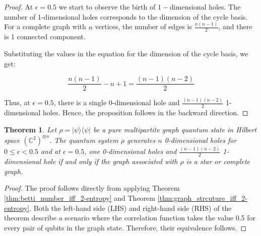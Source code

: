 \documentclass{article}
\newtheorem{theorem}{Theorem}
\newtheorem{corollary}[theorem]{Corollary}
\newcommand{\ket}[1]{|#1\rangle}
\newcommand{\bra}[1]{\langle #1|}
\begin{document}
\begin{proof}
At $\epsilon = 0.5$ we start to observe the birth of $1-$dimensional holes. The number of 1-dimensional holes corresponds to the dimension of the cycle basis. For a complete graph with $ n $ vertices, the number of edges is $ \frac{n(n-1)}{2} $, and there is 1 connected component. 


Substituting the values in the equation for the dimension of the cycle basis, we get:

\begin{equation}
\frac{n(n-1)}{2} - n + 1 = \frac{(n-1)(n-2)}{2}
\end{equation}


Thus, at $ \epsilon = 0.5 $, there is a single 0-dimensional hole and $ \frac{(n-1)(n-2)}{2} $ 1-dimensional holes. Hence, the proposition follows in the backward direction.
\end{proof}


\begin{theorem}
    Let $\rho = \ket{\psi}\bra{\psi}$ be a pure multipartite graph quantum state in Hilbert space $(\mathbb{C}^2)^{\otimes n}$. The quantum system $\rho$ generates $n$ 0-dimensional holes for $0 \leq \epsilon < 0.5$ and at $\epsilon = 0.5$, one 0-dimensional holes and $\frac{(n-1)(n-2)}{2}$ 1-dimensional hole if and only if the graph associated with $\rho$ is a star or complete graph.
\end{theorem}
\begin{proof}
   The proof follows directly from applying Theorem \ref{thm:betti_number_iff_2-entropy} and Theorem \ref{thm:graph_strcuture_iff_2-entropy}. Both the left-hand side (LHS) and right-hand side (RHS) of the theorem describe a scenario where the correlation function takes the value 0.5 for every pair of qubits in the graph state. Therefore, their equivalence follows.
 \end{proof}

 
\end{document}
